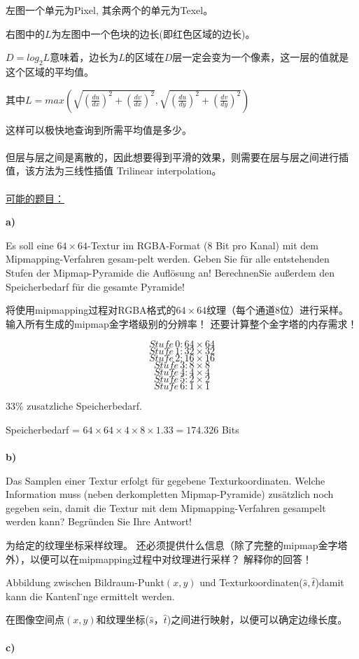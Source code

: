 \documentclass[fleqn]{article}
\begin{document}
左图一个单元为Pixel, 其余两个的单元为Texel。

右图中的$L$为左图中一个色块的边长(即红色区域的边长)。

$D=log_2L$意味着，边长为$L$的区域在$D$层一定会变为一个像素，这一层的值就是这个区域的平均值。

其中$L=max(\sqrt{(\frac{du}{dx})^2+(\frac{dv}{dx})^2},\sqrt{(\frac{du}{dy})^2+(\frac{dv}{dy})^2})$

这样可以极快地查询到所需平均值是多少。
\\
\\
\indent 但层与层之间是离散的，因此想要得到平滑的效果，则需要在层与层之间进行插值，该方法为三线性插值 Trilinear interpolation。
\\
\\
\underline{可能的题目：}

\noindent\textbf{a)} 

Es soll eine $64\times 64$-Textur im RGBA-Format (8 Bit pro Kanal) mit dem Mipmapping-Verfahren gesam-pelt werden. Geben Sie für alle entstehenden Stufen der Mipmap-Pyramide die Auflösung an! BerechnenSie außerdem den Speicherbedarf für die gesamte Pyramide!

将使用mipmapping过程对RGBA格式的$ 64 \times64 $纹理（每个通道8位）进行采样。 输入所有生成的mipmap金字塔级别的分辨率！ 还要计算整个金字塔的内存需求！

$$Stufe\,0:64\times64$$
$$Stufe\,1:32\times32$$
$$Stufe\,2:16\times16$$
$$Stufe\,3:8\times8$$
$$Stufe\,4:4\times4$$
$$Stufe\,5:2\times2$$
$$Stufe\,6:1\times1$$

33\% zusatzliche Speicherbedarf.

Speicherbedarf = $64\times64\times4\times8\times1.33=174.326$ Bits
\\
\\
\noindent\textbf{b)}

Das Samplen einer Textur erfolgt für gegebene Texturkoordinaten. Welche Information muss (neben derkompletten Mipmap-Pyramide) zusätzlich noch gegeben sein, damit die Textur mit dem Mipmapping-Verfahren gesampelt werden kann? Begründen Sie Ihre Antwort!

为给定的纹理坐标采样纹理。 还必须提供什么信息（除了完整的mipmap金字塔外），以便可以在mipmapping过程中对纹理进行采样？ 解释你的回答！

Abbildung zwischen Bildraum-Punkt$(x,y)$ und Texturkoordinaten($\hat{s},\hat{t}$)damit kann die Kantenl ̈nge ermittelt werden.

在图像空间点$(x,y)$和纹理坐标($ \hat {s}，\hat {t} $)之间进行映射，以便可以确定边缘长度。
\\
\\
\noindent\textbf{c)}
\end{document}
